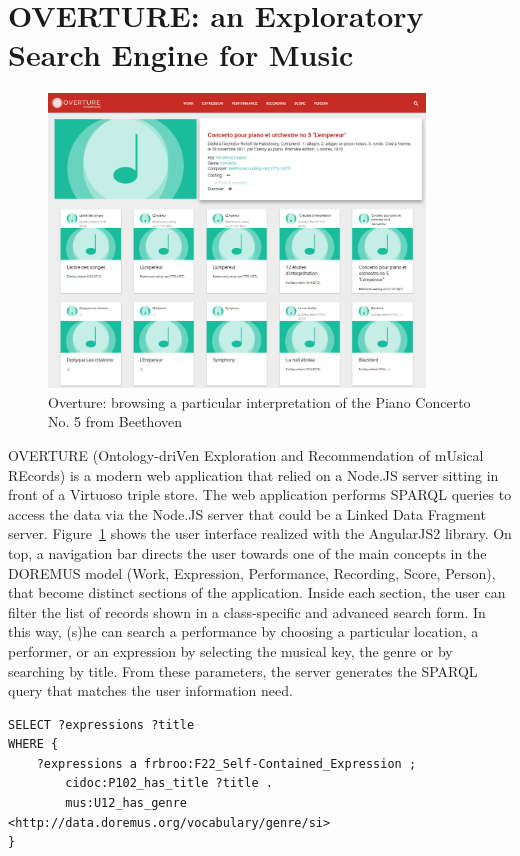 \documentclass[runningheads,a4paper]{llncs}
\begin{document}

\section{OVERTURE: an Exploratory Search Engine for Music}
\label{sec:overture}
\begin{figure}
  \centering
  \includegraphics[width=10cm]{img/overture-detail.png}
  \caption{Overture: browsing a particular interpretation of the Piano Concerto No. 5 from Beethoven}
  \label{fig:overture-detail}
\end{figure}

OVERTURE (Ontology-driVen Exploration and Recommendation of mUsical REcords) is a modern web application that relied on a Node.JS server sitting in front of a Virtuoso triple store. The web application performs SPARQL queries to access the data via the Node.JS server that could be a Linked Data Fragment server. Figure~\ref{fig:overture-detail} shows the user interface realized with the AngularJS2 library. On top, a navigation bar directs the user towards one of the main concepts in the DOREMUS model (Work, Expression, Performance, Recording, Score, Person), that become distinct sections of the application. Inside each section, the user can filter the list of records shown in a class-specific and advanced search form. In this way, (s)he can search a performance by choosing a particular location, a performer, or an expression by selecting the musical key, the genre or by searching by title. From these parameters, the server generates the SPARQL query that matches the user information need.
{\scriptsize
\begin{verbatim}
SELECT ?expressions ?title
WHERE {
    ?expressions a frbroo:F22_Self-Contained_Expression ;
        cidoc:P102_has_title ?title .
        mus:U12_has_genre <http://data.doremus.org/vocabulary/genre/si>
}
\end{verbatim}
}
\end{document}
